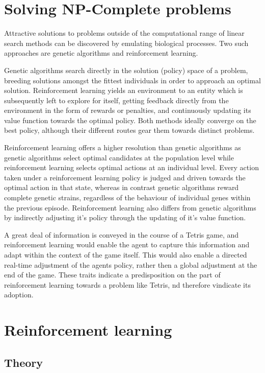 \documentclass{rucsthesis}
\begin{document}
\section{Solving NP-Complete problems}

Attractive solutions to problems outside of the computational range of linear search methods can be discovered by emulating biological processes. Two such approaches are genetic algorithms and reinforcement learning. 

Genetic algorithms search directly in the solution (policy) space of a problem, breeding solutions amongst the fittest individuals in order to approach an optimal solution. Reinforcement learning yields an environment to an entity which is subsequently left to explore for itself, getting feedback directly from the environment in the form of rewards or penalties, and continuously updating its value function towards the optimal policy. Both methods ideally converge on the best policy\citep{evvsrl}, although their different routes gear them towards distinct problems.

Reinforcement learning offers a higher resolution than genetic algorithms as genetic algorithms select optimal candidates at the population level while reinforcement learning  selects optimal actions at an individual level\citep{evvsrl}. Every action taken under a reinforcement learning policy is judged and driven towards the optimal action in that state, whereas in contrast genetic algorithms reward complete genetic strains, regardless of the behaviour of individual genes within the previous episode. Reinforcement learning also differs from genetic algorithms by indirectly adjusting it's policy through the updating of it's value function. 

A great deal of information is conveyed in the course of a Tetris game, and reinforcement learning would enable the agent to capture this information and adapt within the context of the game itself. This would also enable a directed real-time adjustment of the agents policy, rather then a global adjustment at the end of the game. These traits indicate a predisposition on the part of reinforcement learning towards a problem like Tetris, nd therefore vindicate its adoption.

\section{Reinforcement learning}
\subsection{Theory}
\end{document}
